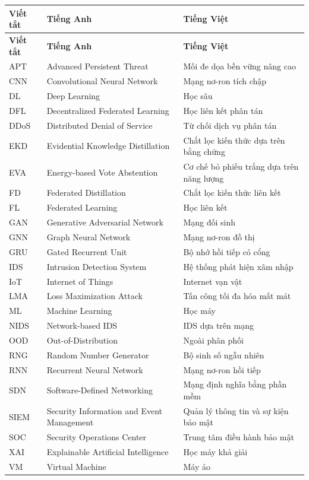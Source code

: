 \small
\begin{longtable}{p{2.8cm} p{3.5cm} p{6.5cm}}
\hline
\textbf{Viết tắt} & \textbf{Tiếng Anh} & \textbf{Tiếng Việt} \\
\hline
\endfirsthead
\hline
\textbf{Viết tắt} & \textbf{Tiếng Anh} & \textbf{Tiếng Việt} \\
\hline
\endhead
\hline
\endfoot
\hline
\endlastfoot
APT & Advanced Persistent Threat & Mối đe dọa bền vững nâng cao \\
CNN & Convolutional Neural Network & Mạng nơ-ron tích chập \\
DL & Deep Learning & Học sâu \\
DFL & Decentralized Federated Learning & Học liên kết phân tán \\
DDoS & Distributed Denial of Service & Từ chối dịch vụ phân tán \\
EKD & Evidential Knowledge Distillation & Chắt lọc kiến thức dựa trên bằng chứng \\
EVA & Energy-based Vote Abstention & Cơ chế bỏ phiếu trắng dựa trên năng lượng \\
FD & Federated Distillation & Chắt lọc kiến thức liên kết \\
FL & Federated Learning & Học liên kết \\
GAN & Generative Adversarial Network & Mạng đối sinh \\
GNN & Graph Neural Network & Mạng nơ-ron đồ thị \\
GRU & Gated Recurrent Unit & Bộ nhớ hồi tiếp có cổng \\
IDS & Intrusion Detection System & Hệ thống phát hiện xâm nhập \\
IoT & Internet of Things & Internet vạn vật \\
LMA & Loss Maximization Attack & Tấn công tối đa hóa mất mát \\
ML & Machine Learning & Học máy \\
NIDS & Network-based IDS & IDS dựa trên mạng \\
OOD & Out-of-Distribution & Ngoài phân phối \\
RNG & Random Number Generator & Bộ sinh số ngẫu nhiên \\
RNN & Recurrent Neural Network & Mạng nơ-ron hồi tiếp \\
SDN & Software-Defined Networking & Mạng định nghĩa bằng phần mềm \\
SIEM & Security Information and Event Management & Quản lý thông tin và sự kiện bảo mật \\
SOC & Security Operations Center & Trung tâm điều hành bảo mật \\
XAI & Explainable Artificial Intelligence & Học máy khả giải \\
VM & Virtual Machine & Máy ảo \\
\end{longtable}

